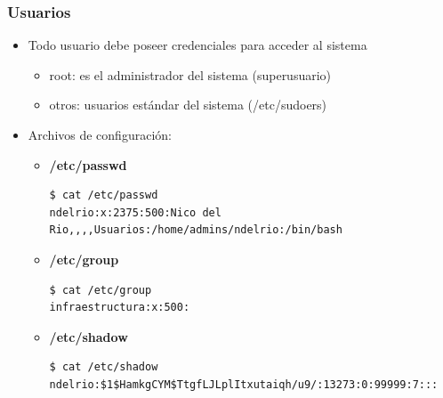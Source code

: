 \begin{frame}[fragile]
  \frametitle{Usuarios}
  \begin{itemize}
	  \item Todo usuario debe poseer credenciales para acceder al sistema
	  \begin{itemize}
	  	\item root: es el administrador del sistema (superusuario)
	  	\item otros: usuarios estándar del sistema (/etc/sudoers)
	  \end{itemize}
	  \item Archivos de configuración:
	  \begin{itemize}
	  	\item \textbf{/etc/passwd}
		\begin{lstlisting}
$ cat /etc/passwd
ndelrio:x:2375:500:Nico del Rio,,,,Usuarios:/home/admins/ndelrio:/bin/bash
		\end{lstlisting}	  	
	  	\item \textbf{/etc/group}
		\begin{lstlisting}
$ cat /etc/group		
infraestructura:x:500:
		\end{lstlisting}	  	
	  	\item \textbf{/etc/shadow}
		\begin{lstlisting}
$ cat /etc/shadow
ndelrio:$1$HamkgCYM$TtgfLJLplItxutaiqh/u9/:13273:0:99999:7:::
		\end{lstlisting}
	  \end{itemize}
  \end{itemize}
\end{frame}

